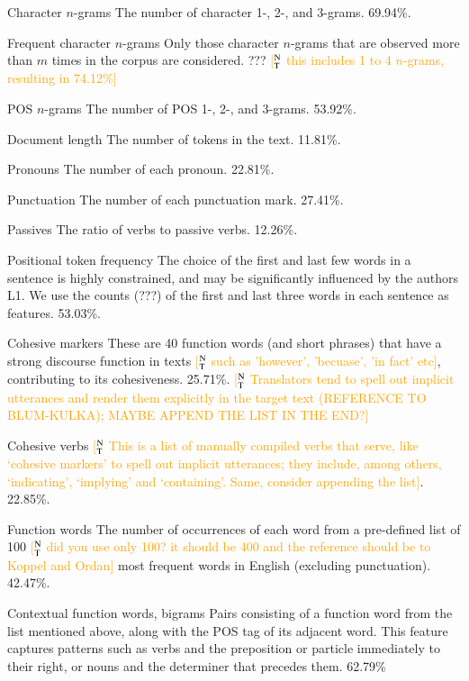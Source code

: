 \documentclass[11pt,letterpaper]{article}
\newcommand{\ensuretext}[1]{#1}
\newcommand{\ntmarker}{\ensuretext{\textcolor{green}{\ensuremath{^{\textsc{N}}_{\textsc{T}}}}}}
\newcommand{\arkcomment}[3]{\ensuretext{\textcolor{#3}{[#1 #2]}}}
\newcommand{\nt}[1]{\arkcomment{\ntmarker}{#1}{orange}}
\begin{document}
\begin{compactdesc}
\item[Character $n$-grams] The number of character 1-, 2-, and
  3-grams. 69.94\%.
\item[Frequent character $n$-grams] Only those character $n$-grams
  that are observed more than $m$ times in the corpus are
  considered. ??? \nt{this includes 1 to 4 $n$-grams, resulting in 74.12\%}
\item[POS $n$-grams] The number of POS 1-, 2-, and 3-grams. 53.92\%.
\item[Document length] The number of tokens in the text. 11.81\%.
\item[Pronouns] The number of each pronoun. 22.81\%.
\item[Punctuation] The number of each punctuation mark. 27.41\%.
\item[Passives] The ratio of verbs to passive verbs. 12.26\%.
\item[Positional token frequency] The choice of the first and last few
  words in a sentence is highly constrained, and may be significantly
  influenced by the authors L1. We use the counts (???) of the first
  and last three words in each sentence as features. 53.03\%.
\item[Cohesive markers] These are 40 function words (and short phrases)
  that have a strong discourse function in texts \nt{such as 'however', 'becuase', 'in fact' etc}, contributing to its
  cohesiveness. 25.71\%. \nt{Translators tend to spell out implicit utterances and render them explicitly in the target text (REFERENCE TO BLUM-KULKA); MAYBE APPEND THE LIST IN THE END?} 
\item[Cohesive verbs] \nt{This is a list of manually compiled verbs that serve, like `cohesive markers' to spell out implicit utterances; they include, among others, `indicating', `implying' and `containing'. Same, consider appending the list}. 22.85\%.
\item[Function words] The number of occurrences of each word from a
  pre-defined list of 100 \nt{did you use only 100? it should be 400 and the reference should be to Koppel and Ordan} most frequent words in English (excluding
  punctuation). 42.47\%.
\item[Contextual function words, bigrams] Pairs consisting of a
  function word from the list mentioned above, along with the POS tag
  of its adjacent word. This feature captures patterns such as verbs
  and the preposition or particle immediately to their right, or nouns
  and the determiner that precedes them. 62.79\%

\end{compactdesc}
\end{document}
